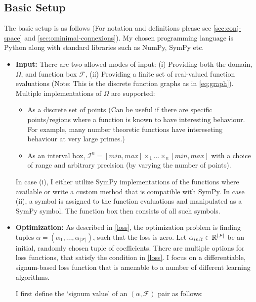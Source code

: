 \subsection{Basic Setup}
\label{sec:basic-setup}
The basic setup is as follows (For notation and definitions please see \ref{sec:conj-space} and \ref{sec:ominimal-connexions}). My chosen programming language is Python along with standard libraries such as NumPy, SymPy etc. 
\begin{itemize}
    \item 
        \textbf{Input:} There are two allowed modes of input: (i) Providing both the domain, $\Omega$, and function box $\mathcal{F}$, (ii) Providing a finite set of real-valued function evaluations (Note: This is the discrete function graphs as in \ref{eq:graph}). Multiple implementations of $\Omega$ are supported: 
          \begin{itemize}
            \item[$\blacktriangleright$] As a discrete set of points (Can be useful if there are specific points/regions where a function is known to have interesting behaviour. For example, many number theoretic functions have intereseting behaviour at very large primes.)
            \item[$\blacktriangleright$] As an interval box, $\mathcal{I}^n = [min, max]\times_1...\times_n[min, max]$ with a choice of range and arbitrary precision (by varying the number of points).
          \end{itemize}
          In case (i), I either utilize SymPy \cite{10.7717/peerj-cs.103} implementations of the functions where available or write a custom method that is compatible with SymPy. In case (ii), a symbol is assigned to the function evaluations and manipulated as a SymPy symbol. The function box then consists of all such symbols.
    \item 
        \textbf{Optimization:} As described in \ref{loss}, the optimization problem is finding tuples $\alpha = (\alpha_1,...,\alpha_{|\mathcal{F}|})$, such that the loss is zero. Let $\alpha_{init}\in\mathbb{R}^{|\mathcal{F}|}$ be an initial, randomly chosen tuple of coefficients.
        There are multiple options for loss functions, that satisfy the condition in \ref{loss}. I focus on a differentiable, signum-based loss function that is amenable to a number of different learning algorithms.
        \begin{definition}
            \label{def:signum-loss}
            I first define the `signum value' of an $(\alpha, \mathcal{F})$ pair as follows:

\end{definition}
\end{itemize}
